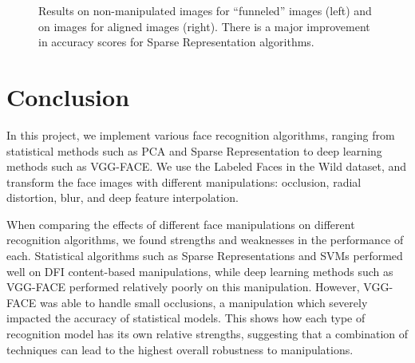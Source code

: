 \documentclass[pageno]{cos429}
\begin{document}
\begin{figure}[ht!]
\centering
{}
\caption{Results on non-manipulated images for ``funneled'' images (left) and on images for aligned images (right). There is a major improvement in accuracy scores for Sparse Representation algorithms.}
\label{fig:results_alignment}
\end{figure}

\section{Conclusion}
In this project, we implement various face recognition algorithms, ranging from statistical methods such as PCA and Sparse Representation to deep learning methods such as VGG-FACE. We use the Labeled Faces in the Wild dataset, and transform the face images with different manipulations: occlusion, radial distortion, blur, and deep feature interpolation.

When comparing the effects of different face manipulations on different recognition algorithms, we found strengths and weaknesses in the performance of each. Statistical algorithms such as Sparse Representations and SVMs performed well on DFI content-based manipulations, while deep learning methods such as VGG-FACE performed relatively poorly on this manipulation. However, VGG-FACE was able to handle small occlusions, a manipulation which severely impacted the accuracy of statistical models. This shows how each type of recognition model has its own relative strengths, suggesting that a combination of techniques can lead to the highest overall robustness to manipulations.
\end{document}
